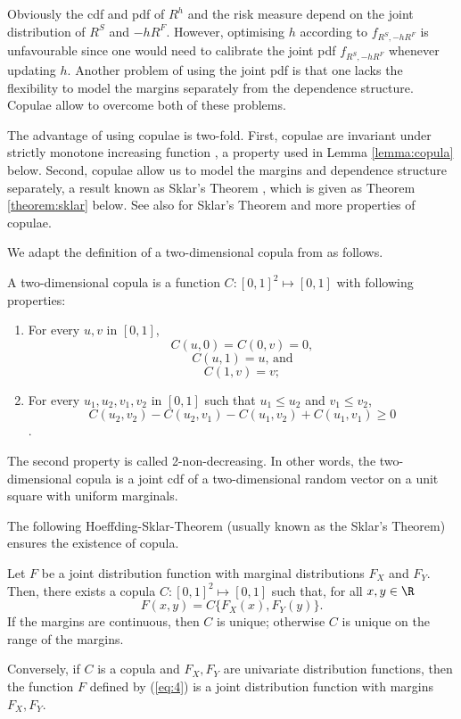 Obviously the cdf and pdf of $R^h$ and the risk measure depend on the
joint distribution of $R^S$ and $-hR^F$. However, optimising $h$
according to $f_{R^S,-hR^F}$ is unfavourable since one would need to
calibrate the joint pdf $f_{R^S,-hR^F}$ whenever updating $h$.
Another problem of using the joint pdf is that one lacks the
flexibility to model the margins separately from the dependence
structure. Copulae allow to overcome both of these problems. 

The advantage of using copulae is two-fold.
First, copulae are invariant under strictly
monotone increasing function \citep{schweizer1981nonparametric}, a
property used in Lemma \ref{lemma:copula} below. 
Second, copulae allow us to model the margins and dependence structure 
separately, a result known as Sklar's Theorem \citep{Sklar1959}, which
is given as Theorem \ref{theorem:sklar} below. 
See also \citep{Nelsen1999, joe1997multivariate, McNeil2005} for
Sklar's Theorem and more properties of copulae.

We adapt the definition of a two-dimensional copula from \citep{Nelsen1999} as follows.

\begin{defi} 
  A two-dimensional copula is a function $C: [0,1]^2 \mapsto [0,1]$ with following properties:
  \begin{enumerate}
    \item For every $u,v$ in $[0,1]$,
      \[C(u,0)= C(0,v)=0, \]
    \[C(u,1)= u \text{, and}\]
    \[C(1,v)= v;\]
    \item For every $u_1,u_2, v_1, v_2$ in $[0,1]$ such that $u_1 \leq u_2$ and $v_1 \leq v_2$,
    \[C(u_2,v_2)-C(u_2,v_1)-C(u_1, v_2)+C(u_1,v_1) \geq 0\].
    \end{enumerate}
  \end{defi}

The second property is called 2-non-decreasing.
In other words, the two-dimensional copula is a joint cdf of a two-dimensional random vector
on a unit square with uniform marginals.

The following Hoeffding-Sklar-Theorem (usually known as the Sklar's Theorem) ensures the existence of copula.

\begin{theorem}
  \label{theorem:sklar}
  Let $F$ be a joint distribution function with marginal distributions
  $F_X$ and $F_Y$. Then, there exists a copula $C:[0,1]^2 \mapsto
  [0,1]$ such that, for all $x,y\in \R$
  \begin{equation}
    \label{eq:4}
    F(x,y)=C\{F_X(x), F_Y(y)\}.
  \end{equation}
  If the margins are continuous, then $C$ is unique; otherwise $C$ is
  unique on the range of the margins.

  Conversely, if $C$ is a copula and $F_X, F_Y$ are univariate
  distribution functions, then the function $F$ defined by (\ref{eq:4})
  is a joint distribution function with margins $F_X, F_Y$.
\end{theorem}

